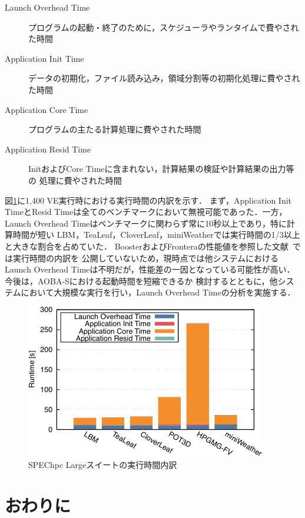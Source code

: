 ﻿\documentclass[submit,techrep,noauthor]{ipsj}
\begin{document}
\begin{description}
  \item[Launch Overhead Time] プログラムの起動・終了のために，スケジューラやランタイムで費やされた時間
  \item[Application Init Time] データの初期化，ファイル読み込み，領域分割等の初期化処理に費やされた時間
  \item[Application Core Time] プログラムの主たる計算処理に費やされた時間
  \item[Application Resid Time] InitおよびCore Timeに含まれない，計算結果の検証や計算結果の出力等の
      処理に費やされた時間
\end{description}

図\ref{fig:spechpc-profile2}に1,400 VE実行時における実行時間の内訳を示す．
まず，Application Init TimeとResid Timeは全てのベンチマークにおいて無視可能であった．一方，
Launch Overhead Timeはベンチマークに関わらず常に10秒以上であり，特に計算時間が短い
LBM，TeaLeaf，CloverLeaf，miniWeatherでは実行時間の1/3以上と大きな割合を占めていた．
BoosterおよびFronteraの性能値を参照した文献~\cite{Brunst2022}では実行時間の内訳を
公開していないため，現時点では他システムにおけるLaunch Overhead
Timeは不明だが，性能差の一因となっている可能性が高い．今後は，AOBA-Sにおける起動時間を短縮できるか
検討するとともに，他システムにおいて大規模な実行を行い，Launch Overhead Timeの分析を実施する．

\begin{figure}[tb]
  \centering
  \includegraphics{figs/spechpc_profile2.pdf}
  \caption{SPEChpc Largeスイートの実行時間内訳}\label{fig:spechpc-profile2}
\end{figure}

\section{おわりに}
\end{document}
